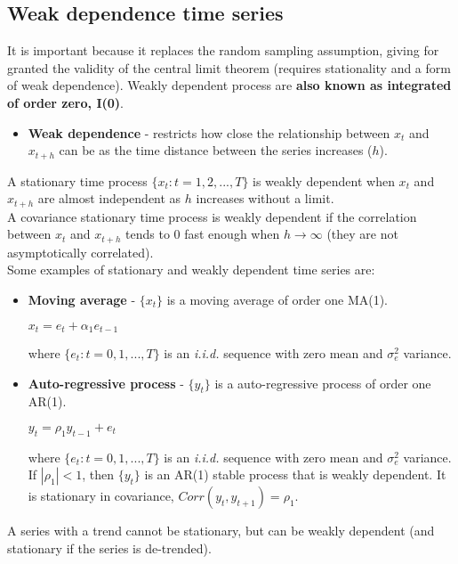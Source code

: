 \documentclass[10pt, a4paper, landscape]{extarticle}
\begin{document}
\begin{multicols}{3}
	\subsection*{Weak dependence time series}
		It is important because it replaces the random sampling assumption, giving for granted the validity of the central limit theorem (requires stationality and a form of weak dependence). Weakly dependent process are \textbf{also known as integrated of order zero, I(0)}.
		\begin{itemize}[leftmargin=*]
			\item \textbf{Weak dependence} - restricts how close the relationship between $x_t$ and $x_{t+h}$ can be as the time distance between the series increases ($h$).
		\end{itemize}
		A stationary time process $\lbrace x_t: t = 1, 2, ..., T \rbrace$ is weakly dependent when $x_t$ and $x_{t+h}$ are almost independent as $h$ increases without a limit.
		\\ A covariance stationary time process is weakly dependent if the correlation between $x_t$ and $x_{t+h}$ tends to $0$ fast enough when $h \rightarrow \infty$ (they are not asymptotically correlated).
		\\ Some examples of stationary and weakly dependent time series are:
		\begin{itemize}[leftmargin=*]
			\item \textbf{Moving average} - $\lbrace x_t \rbrace$ is a moving average of order one MA(1).
			\begin{center}
				$x_t = e_t + \alpha_1 e_{t-1}$
			\end{center}
			where $\lbrace e_t: t = 0, 1, ..., T \rbrace$ is an \textsl{i.i.d.} sequence with zero mean and $\sigma^2_e$ variance. 
			\item \textbf{Auto-regressive process} - $\lbrace y_t \rbrace$ is a auto-regressive process of order one AR(1).
			\begin{center}
				$y_t = \rho_1 y_{t-1} + e_t$
			\end{center}
			where $\lbrace e_t: t = 0, 1, ..., T \rbrace$ is an \textsl{i.i.d.} sequence with zero mean and $\sigma^2_e$ variance.		
		\\ If $|\rho_1|<1$, then $\lbrace y_t \rbrace$ is an AR(1) stable process that is weakly dependent. It is stationary in covariance, $Corr(y_t, y_{t+1}) = \rho_1$.
		\end{itemize}
	A series with a trend cannot be stationary, but can be weakly dependent (and stationary if the series is de-trended).
	

\end{multicols}
\end{document}
